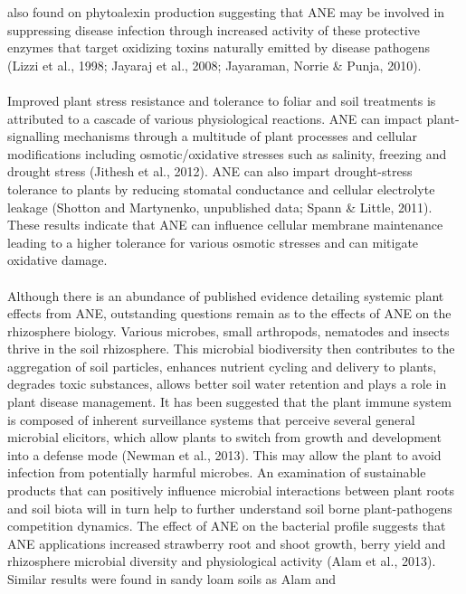 \documentclass[12pt,]{article}
\begin{document}
also found on phytoalexin production suggesting that ANE may be involved
in suppressing disease infection through increased activity of these
protective enzymes that target oxidizing toxins naturally emitted by
disease pathogens (Lizzi et al., 1998; Jayaraj et al., 2008; Jayaraman,
Norrie \& Punja, 2010).\\
\hspace*{0.333em}\\
Improved plant stress resistance and tolerance to foliar and soil
treatments is attributed to a cascade of various physiological
reactions. ANE can impact plant-signalling mechanisms through a
multitude of plant processes and cellular modifications including
osmotic/oxidative stresses such as salinity, freezing and drought stress
(Jithesh et al., 2012). ANE can also impart drought-stress tolerance to
plants by reducing stomatal conductance and cellular electrolyte leakage
(Shotton and Martynenko, unpublished data; Spann \& Little, 2011). These
results indicate that ANE can influence cellular membrane maintenance
leading to a higher tolerance for various osmotic stresses and can
mitigate oxidative damage.\\
\hspace*{0.333em}\\
Although there is an abundance of published evidence detailing systemic
plant effects from ANE, outstanding questions remain as to the effects
of ANE on the rhizosphere biology. Various microbes, small arthropods,
nematodes and insects thrive in the soil rhizosphere. This microbial
biodiversity then contributes to the aggregation of soil particles,
enhances nutrient cycling and delivery to plants, degrades toxic
substances, allows better soil water retention and plays a role in plant
disease management. It has been suggested that the plant immune system
is composed of inherent surveillance systems that perceive several
general microbial elicitors, which allow plants to switch from growth
and development into a defense mode (Newman et al., 2013). This may
allow the plant to avoid infection from potentially harmful microbes. An
examination of sustainable products that can positively influence
microbial interactions between plant roots and soil biota will in turn
help to further understand soil borne plant-pathogens competition
dynamics. The effect of ANE on the bacterial profile suggests that ANE
applications increased strawberry root and shoot growth, berry yield and
rhizosphere microbial diversity and physiological activity (Alam et al.,
2013). Similar results were found in sandy loam soils as Alam and
\end{document}

